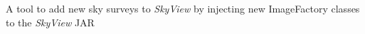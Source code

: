 



\begin{cvparagraph}
    A tool to add new sky surveys to \textit{SkyView} by injecting new ImageFactory classes to the \textit{SkyView} JAR
\end{cvparagraph}

